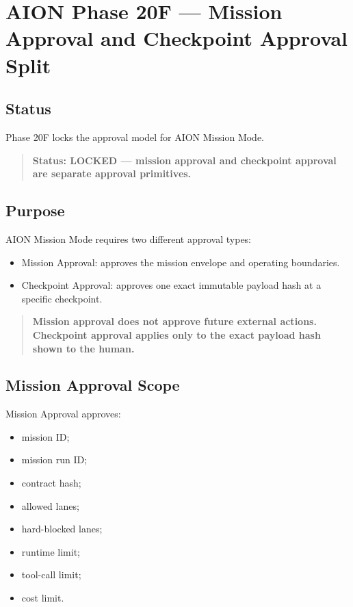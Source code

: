 \section{AION Phase 20F --- Mission Approval and Checkpoint Approval Split}
\label{sec:aion-phase20f-approval-split}

\subsection{Status}

Phase 20F locks the approval model for AION Mission Mode.

\begin{quote}
\textbf{Status: LOCKED --- mission approval and checkpoint approval are separate approval primitives.}
\end{quote}

\subsection{Purpose}

AION Mission Mode requires two different approval types:

\begin{itemize}
  \item Mission Approval: approves the mission envelope and operating boundaries.
  \item Checkpoint Approval: approves one exact immutable payload hash at a specific checkpoint.
\end{itemize}

\begin{quote}
\textbf{Mission approval does not approve future external actions. Checkpoint approval applies only to the exact payload hash shown to the human.}
\end{quote}

\subsection{Mission Approval Scope}

Mission Approval approves:

\begin{itemize}
  \item mission ID;
  \item mission run ID;
  \item contract hash;
  \item allowed lanes;
  \item hard-blocked lanes;
  \item runtime limit;
  \item tool-call limit;
  \item cost limit.
\end{itemize}

